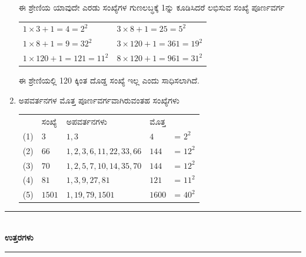 \begin{enumerate}
ಈ ಶ್ರೇಣಿಯ ಯಾವುದೇ ಎರಡು ಸಂಖ್ಯೆಗಳ ಗುಣಲಬ್ಧಕ್ಕೆ 1ನ್ನು ಕೂಡಿಸಿದರೆ ಲಭಿಸುವ ಸಂಖ್ಯೆ ಪೂರ್ಣವರ್ಗ 

\vskip 0.2cm

\begin{tabular}[t]{ll}
$1 \times 3 + 1 = 4 = 2^{2}$ & $3\times 8 + 1 = 25 = 5^{2}$\\
$1 \times 8 + 1 = 9 =32^{2}$ & $3\times 120 + 1 = 361 = 19^{2}$\\
$1 \times 120 + 1 = 121 = 11^{2}$ & $8\times 120 + 1 = 961 = 31^{2}$\\
\end{tabular}

\vskip 0.1cm

ಈ ಶ್ರೇಣಿಯಲ್ಲಿ 120 ಕ್ಕಿಂತ ದೊಡ್ಡ ಸಂಖ್ಯೆ ಇಲ್ಲ ಎಂದು ಸಾಧಿಸಲಾಗಿದೆ. 

\item ಅಪವರ್ತನಗಳ ಮೊತ್ತ ಪೂರ್ಣವರ್ಗವಾಗಿರುವಂತಹ ಸಂಖ್ಯೆಗಳು 

\begin{tabular}[t]{lllll}
 & ಸಂಖ್ಯೆ & ಅಪವರ್ತನಗಳು & ಮೊತ್ತ & \\
 (1) & $3$ & $1, 3$ & $4$ & = $2^{2}$\\
 (2) & $66$ & $1, 2, 3, 6, 11, 22, 33, 66$ & $144$ & = $12^{2}$\\
 (3) & $70$ & $1, 2, 5, 7, 10, 14, 35, 70$ & $144$ & = $12^{2}$\\
 (4) & $81$ & $1, 3, 9, 27, 81$ & $121$ & = $11^{2}$\\
 (5) & $1501$ & $1, 19, 79, 1501$ & $1600$ & = $40^{2}$
\end{tabular}
\end{enumerate}

\smallskip

\begin{center}
\rule{5cm}{1pt}\\[3pt]
{\Large\bfseries ಉತ್ತರಗಳು}\\[-0.1cm]
\rule{5cm}{1pt}
\end{center}

